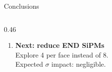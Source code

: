\documentclass[aspectratio=169,9pt]{beamer}
\begin{document}
\begin{frame}{Conclusions}
\begin{columns}[T]
\begin{column}{0.46\textwidth}
\begin{enumerate}
  \vspace{0.2em}
  \item \textbf{Next: reduce END SiPMs}\\
        Explore 4 per face instead of 8.\\
        Expected $\sigma$ impact: negligible.
\end{enumerate}
\end{column}
\end{columns}
\end{frame}
\end{document}
